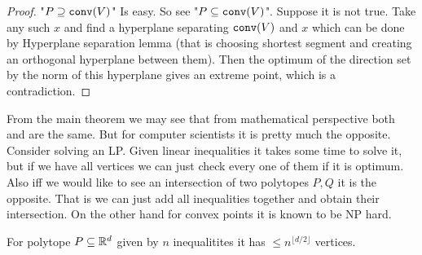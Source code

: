 \begin{proof}
	"$P \supseteq \mathtt{conv}(V)$" Is easy. So see "$P \subseteq \mathtt{conv}(V)$". Suppose it is not true. Take any such $x$ and find a hyperplane separating $\mathtt{conv}(V)$ and $x$ which can be done by Hyperplane separation lemma (that is choosing shortest segment and creating an orthogonal hyperplane between them). Then the optimum of the direction set by the norm of this hyperplane gives an extreme point, which is a contradiction.
\end{proof}

From the main theorem we may see that from mathematical perspective both  and  are the same. But for computer scientists it is pretty much the opposite. Consider solving an LP. Given linear inequalities it takes some time to solve it, but if we have all vertices we can just check every one of them if it is optimum. Also iff we would like to see an intersection of two polytopes $P,Q$ it is the opposite. That is we can just add all inequalities together and obtain their intersection. On the other hand for convex points it is known to be NP hard.

\begin{fact}
	For polytope $P \subseteq \mathbb{R}^{d}$ given by $n$ inequalitites it has $\leq n^{\lfloor d/2 \rfloor}$ vertices.
\end{fact}
